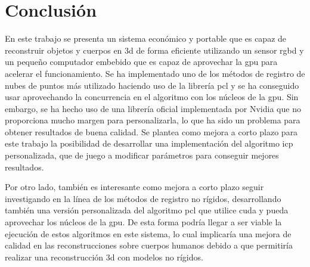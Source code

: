 \chapter{Conclusión}
\label{cap:conclusion}

En este trabajo se presenta un sistema económico y portable que es capaz de reconstruir objetos y cuerpos en \gls{3d} de forma eficiente utilizando un sensor \gls{rgbd} y un pequeño computador embebido que es capaz de aprovechar la \gls{gpu} para acelerar el funcionamiento.
Se ha implementado uno de los métodos de registro de nubes de puntos más utilizado haciendo uso de la librería \gls{pcl} y se ha conseguido usar aprovechando la concurrencia en el algoritmo con los núcleos de la \gls{gpu}.
Sin embargo, se ha hecho uso de una librería oficial implementada por Nvidia que no proporciona mucho margen para personalizarla, lo que ha sido un problema para obtener resultados de buena calidad.
Se plantea como mejora a corto plazo para este trabajo la posibilidad de desarrollar una implementación del algoritmo \gls{icp} personalizada, que de juego a modificar parámetros para conseguir mejores resultados.

Por otro lado, también es interesante como mejora a corto plazo seguir investigando en la línea de los métodos de registro no rígidos, desarrollando también una versión personalizada del algoritmo \gls{pcl} que utilice \gls{cuda} y pueda aprovechar los núcleos de la \gls{gpu}.
De esta forma podría llegar a ser viable la ejecución de estos algoritmos en este sistema, lo cual implicaría una mejora de calidad en las reconstrucciones sobre cuerpos humanos debido a que permitiría realizar una reconstrucción \gls{3d} con modelos no rígidos.